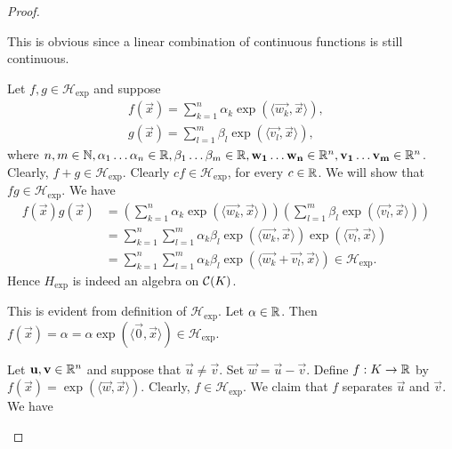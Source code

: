 \begin{proof}
\setcounter{step}{0}
\begin{step}
This is obvious since a linear combination of continuous functions is still continuous.
\end{step}
\begin{step}
Let $f, g \in \mathcal{H}_{\exp}$ and suppose \begin{align*}
    f (\vec{x}) = \sum_{k = 1}^n  \alpha_k \exp{\left (\langle \vec{w_k}, \vec{x} \rangle \right)}, & \\
    g(\vec{x}) =  \sum_{l = 1}^m  \beta_l \exp{\left (\langle \vec{v_l}, \vec{x} \rangle \right)},
\end{align*}
where $n, m \in {\mathbb N}, \alpha_1 \ldots \alpha_n \in {\mathbb R}, \beta_1 \ldots \beta_m \in {\mathbb R}, \mathbf{w_1} \ldots \mathbf{w_n} \in {\mathbb R}^n, \mathbf{v_1} \ldots \mathbf{v_m} \in {\mathbb R}^n$.
Clearly, $f + g \in \mathcal{H}_{\exp}$. Clearly $c f \in \mathcal{H}_{\exp}$, for every $c \in {\mathbb R}$. We will show that $fg \in \mathcal{H}_{\exp}$. We have
\begin{align*}
    f (\vec{x}) g (\vec{x}) &= \left( \sum_{k = 1}^n  \alpha_k \exp{\left (\langle \vec{w_k}, \vec{x} \rangle \right)} \right) \left( \sum_{l = 1}^m  \beta_l \exp{\left (\langle \vec{v_l}, \vec{x} \rangle \right)} \right) & \\
                            &= \sum_{k = 1}^n \sum_{l = 1}^m \alpha_k \beta_l \exp{\left (\langle \vec{w_k}, \vec{x} \rangle \right)} \exp{\left (\langle \vec{v_l}, \vec{x} \rangle \right)} & \\
                            &= \sum_{k = 1}^n \sum_{l = 1}^m \alpha_k \beta_l \exp{\left (\langle \vec{w_k} + \vec{v_l}, \vec{x} \rangle \right)} \in \mathcal{H}_{\exp}.
\end{align*}
Hence $H_{\exp}$ is indeed an algebra on ${\mathcal C}(K)$.
\end{step}

\begin{step}
This is evident from definition of $\mathcal{H}_{\exp}$. Let $\alpha \in {\mathbb R}$. Then
$ f (\vec{x}) = \alpha = \alpha  \exp{\left (\langle \vec{0}, \vec{x} \rangle \right)} \in \mathcal{H}_{\exp}$.
\end{step}

\begin{step}
Let $\mathbf{u}, \mathbf{v} \in {\mathbb R}^n$ and suppose that $\vec{u} \neq \vec{v}$. Set $\vec{w} = \vec{u} - \vec{v}$. Define $f :K \to {\mathbb R}$ by  $f(\vec{x}) = \exp \left ( {\langle \vec{w}, \vec{x} \rangle } \right)$. Clearly, $f \in \mathcal{H}_{\exp}$.  We claim that $f$ separates $\vec{u}$ and $\vec{v}$. We have


\end{step}
\end{proof}
